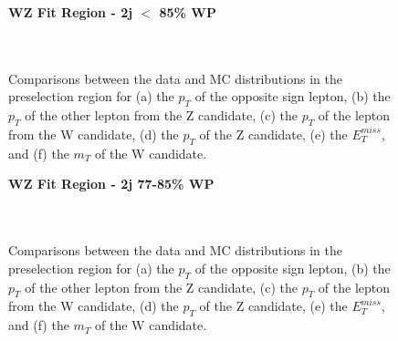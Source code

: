 \begin{figure}[H]
    \centering
    \textbf{WZ Fit Region - 2j $<$ 85\% WP}\\
    \\
    \\
    \caption{Comparisons between the data and MC distributions in the preselection region for (a) the $p_T$ of the opposite sign lepton, (b) the $p_T$ of the other lepton from the Z candidate, (c) the $p_T$ of the lepton from the W candidate, (d) the $p_T$ of the Z candidate, (e) the $E_T^{miss}$, and (f) the $m_T$ of the W candidate.}
    \label{kin:WP_2j_not85}
\end{figure}

\begin{figure}[H]
    \centering
    \textbf{WZ Fit Region - 2j 77-85\% WP}\\
    \\
    \\
    \caption{Comparisons between the data and MC distributions in the preselection region for (a) the $p_T$ of the opposite sign lepton, (b) the $p_T$ of the other lepton from the Z candidate, (c) the $p_T$ of the lepton from the W candidate, (d) the $p_T$ of the Z candidate, (e) the $E_T^{miss}$, and (f) the $m_T$ of the W candidate.}
    \label{kin:WP_2j_77_85}
\end{figure}

